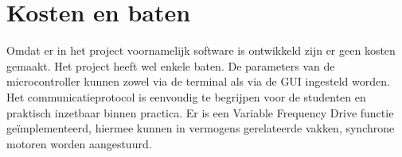 \section{Kosten en baten}
Omdat er in het project voornamelijk software is ontwikkeld zijn er geen kosten gemaakt. Het project heeft wel enkele baten. De parameters van de microcontroller kunnen zowel via de terminal als via de GUI ingesteld worden. Het communicatieprotocol is eenvoudig te begrijpen voor de studenten en praktisch inzetbaar binnen practica. Er is een Variable Frequency Drive functie geïmplementeerd, hiermee kunnen in vermogens gerelateerde vakken, synchrone motoren worden aangestuurd.  